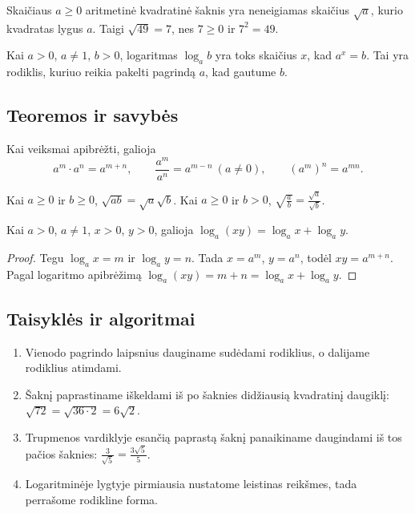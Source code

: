 \begin{apibreztis}
Skaičiaus $a\ge 0$ aritmetinė kvadratinė šaknis yra neneigiamas skaičius $\sqrt a$, kurio kvadratas lygus $a$. Taigi $\sqrt{49}=7$, nes $7\ge0$ ir $7^2=49$.
\end{apibreztis}

\begin{apibreztis}
Kai $a>0$, $a\ne1$, $b>0$, logaritmas $\log_a b$ yra toks skaičius $x$, kad $a^x=b$. Tai yra rodiklis, kuriuo reikia pakelti pagrindą $a$, kad gautume $b$.
\end{apibreztis}

\subsection{Teoremos ir savybės}

\begin{savybe}
Kai veiksmai apibrėžti, galioja
\[
a^m\cdot a^n=a^{m+n},\qquad \frac{a^m}{a^n}=a^{m-n}\ (a\ne0),\qquad (a^m)^n=a^{mn}.
\]
\end{savybe}

\begin{savybe}
Kai $a\ge0$ ir $b\ge0$, $\sqrt{ab}=\sqrt a\sqrt b$. Kai $a\ge0$ ir $b>0$, $\sqrt{\frac ab}=\frac{\sqrt a}{\sqrt b}$.
\end{savybe}

\begin{teorema}
Kai $a>0$, $a\ne1$, $x>0$, $y>0$, galioja $\log_a(xy)=\log_a x+\log_a y$.
\end{teorema}
\begin{proof}
Tegu $\log_a x=m$ ir $\log_a y=n$. Tada $x=a^m$, $y=a^n$, todėl $xy=a^{m+n}$. Pagal logaritmo apibrėžimą $\log_a(xy)=m+n=\log_a x+\log_a y$.
\end{proof}

\subsection{Taisyklės ir algoritmai}

\begin{enumerate}
\item Vienodo pagrindo laipsnius dauginame sudėdami rodiklius, o dalijame rodiklius atimdami.
\item Šaknį paprastiname iškeldami iš po šaknies didžiausią kvadratinį daugiklį: $\sqrt{72}=\sqrt{36\cdot2}=6\sqrt2$.
\item Trupmenos vardiklyje esančią paprastą šaknį panaikiname daugindami iš tos pačios šaknies: $\frac{3}{\sqrt5}=\frac{3\sqrt5}{5}$.
\item Logaritminėje lygtyje pirmiausia nustatome leistinas reikšmes, tada perrašome rodikline forma.
\end{enumerate}

